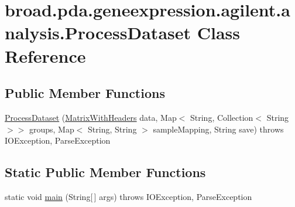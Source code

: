 \hypertarget{classbroad_1_1pda_1_1geneexpression_1_1agilent_1_1analysis_1_1_process_dataset}{\section{broad.\+pda.\+geneexpression.\+agilent.\+analysis.\+Process\+Dataset Class Reference}
\label{classbroad_1_1pda_1_1geneexpression_1_1agilent_1_1analysis_1_1_process_dataset}
}
\subsection*{Public Member Functions}
\begin{DoxyCompactItemize}
\item 
\hyperlink{classbroad_1_1pda_1_1geneexpression_1_1agilent_1_1analysis_1_1_process_dataset_a25b0ca0cea2f6ea1690d81291be97395}{Process\+Dataset} (\hyperlink{classbroad_1_1core_1_1datastructures_1_1_matrix_with_headers}{Matrix\+With\+Headers} data, Map$<$ String, Collection$<$ String $>$$>$ groups, Map$<$ String, String $>$ sample\+Mapping, String save)  throws I\+O\+Exception, Parse\+Exception
\end{DoxyCompactItemize}
\subsection*{Static Public Member Functions}
\begin{DoxyCompactItemize}
\item 
static void \hyperlink{classbroad_1_1pda_1_1geneexpression_1_1agilent_1_1analysis_1_1_process_dataset_aafc8e18995266e42bedf8bd4b1c176d1}{main} (String\mbox{[}$\,$\mbox{]} args)  throws I\+O\+Exception, Parse\+Exception
\end{DoxyCompactItemize}


